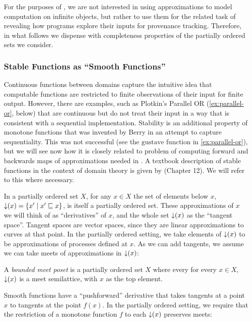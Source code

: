 For the purposes of \GPS, we are not interested in using
approximations to model computation on infinite objects, but rather to
use them for the related task of revealing how programs explore their
inputs for provenance tracking. Therefore, in what follows we dispense with completeness properties of the partially ordered sets we consider.

\subsubsection{Stable Functions as ``Smooth Functions''}

Continuous functions between domains capture the intuitive idea that
computable functions are restricted to finite observations of their
input for finite output. However, there are examples, such as
Plotkin's Parallel OR (\autoref{ex:parallel-or}, below) that are
continuous but do not treat their input in a way that is consistent
with a sequential implementation. Stability is an additional property
of monotone functions that was invented by Berry \cite{berry86} in an
attempt to capture sequentiality. This was not successful (see the
$\mathrm{gustave}$ function in \autoref{ex:parallel-or}), but we will
see now how it is closely related to problem of computing forward and
backwards maps of approximations needed in \GPS. A textbook
description of stable functions in the context of domain theory is
given by \citet{amadio-curien} (Chapter 12). We will
refer to this where necessary.

In a partially ordered set $X$, for any $x \in X$ the set of elements
below $x$, $\mathop{\downarrow}(x) = \{ x' \mid x' \sqsubseteq x \}$, is itself a
partially ordered set. These approximations of $x$ we will think of as
``derivatives'' of $x$, and the whole set $\mathop{\downarrow}(x)$ as the
``tangent space''. Tangent spaces are vector spaces, since they are
linear approximations to curves at that point. In the partially
ordered setting, we take elements of $\mathop{\downarrow}(x)$ to be
approximations of processes defined at $x$. As we can add tangents, we
assume we can take meets of approximations in $\mathop{\downarrow}(x)$:

\begin{definition}
  A \emph{bounded meet poset} is a partially ordered set $X$ where
  every for every $x \in X$, $\mathop{\downarrow}(x)$ is a meet semilattice, with
  $x$ as the top element.
\end{definition}

Smooth functions have a ``pushforward'' derivative that takes tangents
at a point $x$ to tangents at the point $f(x)$. In the partially
ordered setting, we require that the restriction of a monotone
function $f$ to each $\mathop{\downarrow}(x)$ preserves meets:

